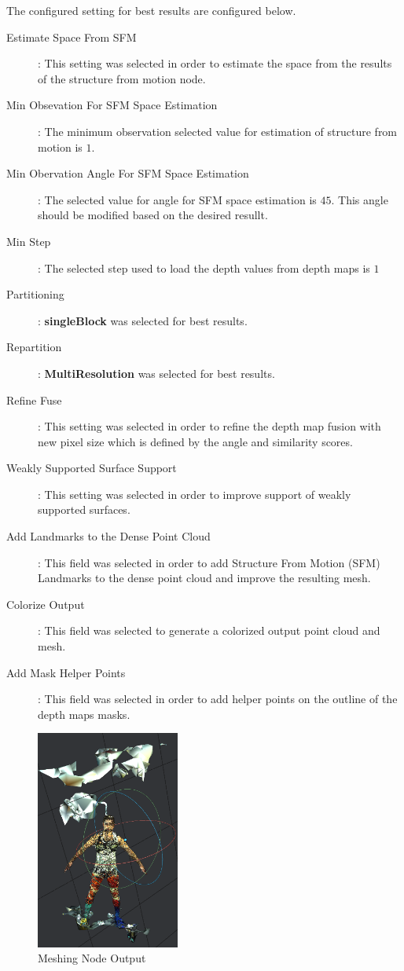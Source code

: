 \documentclass[12pt]{report}
\begin{document}
The configured setting for best results are configured below.

\begin{description}
  \item[Estimate Space From SFM] : This setting was selected in order to estimate the space from the results of the structure from motion node.
  \item[Min Obsevation For SFM Space Estimation] : The minimum observation selected value for estimation of structure from motion is $1$.
  \item[Min Obervation Angle For SFM Space Estimation]: The selected value for angle for SFM space estimation is $45$. This angle should be modified based on the desired resullt.
  \item[Min Step]: The selected step used to load the depth values  from depth maps is $1$
  \item[Partitioning]: \textbf{singleBlock} was selected for best results.
  \item[Repartition] : \textbf{MultiResolution} was selected for best results.
  \item[Refine Fuse] : This setting was selected in order to refine the depth map fusion  with new pixel size which is defined by the angle and similarity scores.
  \item[Weakly Supported Surface Support]: This setting was selected in order to improve support of weakly supported surfaces.
  \item[Add Landmarks to the Dense Point Cloud]: This field was selected in order to add Structure From Motion (SFM) Landmarks to the dense point cloud and improve the resulting mesh.
  \item[Colorize Output]: This field was selected to generate a colorized output point cloud and mesh.
  \item[Add Mask Helper Points]: This field was selected in order to add helper points on the outline of the depth maps masks.
\end{description}

\begin{figure}[H]%
  \centering
 \includegraphics[width=0.42\textwidth]{meshoing.png}
\caption{Meshing Node Output}
\label{fig:meshrom_mesh} 
\end{figure}
\end{document}
